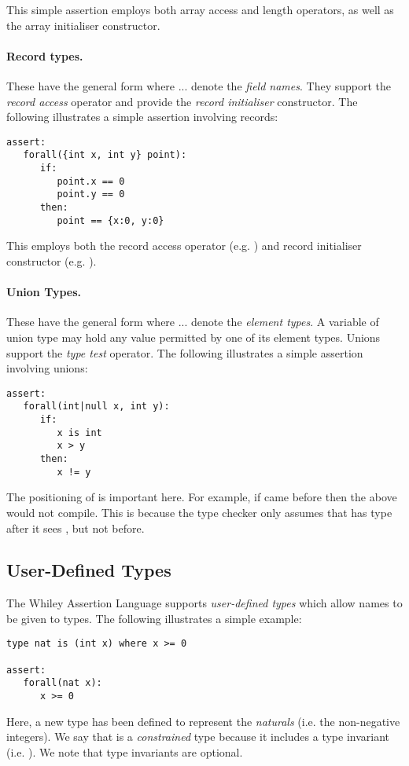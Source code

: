 This simple assertion employs both array access and length operators,
as well as the array initialiser constructor.

\paragraph{Record types.} These have the general form  where  ...  denote the
{\em field names}.  They support the {\em record access} operator and
provide the {\em record initialiser} constructor.  The following
illustrates a simple assertion involving records:

\begin{lstlisting}[language=WyAL]
assert:
   forall({int x, int y} point):
      if:
         point.x == 0
         point.y == 0
      then:
         point == {x:0, y:0}
\end{lstlisting}

This employs both the record access operator
(e.g. ) and record initialiser constructor
(e.g. ).

\paragraph{Union Types.}  These have the general form  where  ...  denote the
{\em element types}.  A variable of union type may hold any value
permitted by one of its element types.  Unions support the {\em type
  test} operator.  The following illustrates a simple assertion
involving unions:
\begin{lstlisting}[language=WyAL]
assert:
   forall(int|null x, int y):
      if:
         x is int
         x > y
      then:
         x != y
\end{lstlisting}
The positioning of  is important here.  For
example, if  came before 
then the above would not compile.  This is because the type checker
only assumes that  has type  after it sees
, but not before.

\subsection{User-Defined Types}
 
The Whiley Assertion Language supports {\em user-defined types} which
allow names to be given to types.  The following illustrates a simple
example:
\begin{lstlisting}[language=WyAL]
type nat is (int x) where x >= 0

assert:
   forall(nat x):
      x >= 0
\end{lstlisting}
Here, a new type  has been defined to represent the
{\em naturals} (i.e. the non-negative integers).  We say that
 is a {\em constrained} type because it includes a type
invariant (i.e. ).  We note that type invariants
are optional.

